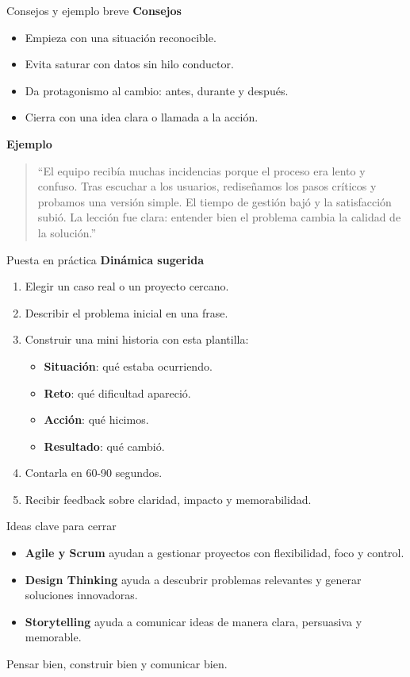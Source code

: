 \documentclass{beamer}
\begin{document}
\begin{frame}{Consejos y ejemplo breve}
\textbf{Consejos}
\begin{itemize}
    \item Empieza con una situación reconocible.
    \item Evita saturar con datos sin hilo conductor.
    \item Da protagonismo al cambio: antes, durante y después.
    \item Cierra con una idea clara o llamada a la acción.
\end{itemize}

\vspace{0.25cm}
\textbf{Ejemplo}
\begin{quote}
``El equipo recibía muchas incidencias porque el proceso era lento y confuso. Tras escuchar a los usuarios, rediseñamos los pasos críticos y probamos una versión simple. El tiempo de gestión bajó y la satisfacción subió. La lección fue clara: entender bien el problema cambia la calidad de la solución.''
\end{quote}
\end{frame}

\begin{frame}{Puesta en práctica}
\textbf{Dinámica sugerida}
\begin{enumerate}
    \item Elegir un caso real o un proyecto cercano.
    \item Describir el problema inicial en una frase.
    \item Construir una mini historia con esta plantilla:
    \begin{itemize}
        \item \textbf{Situación}: qué estaba ocurriendo.
        \item \textbf{Reto}: qué dificultad apareció.
        \item \textbf{Acción}: qué hicimos.
        \item \textbf{Resultado}: qué cambió.
    \end{itemize}
    \item Contarla en 60-90 segundos.
    \item Recibir feedback sobre claridad, impacto y memorabilidad.
\end{enumerate}
\end{frame}

\begin{frame}{Ideas clave para cerrar}
\begin{itemize}
    \item \textbf{Agile y Scrum} ayudan a gestionar proyectos con flexibilidad, foco y control.
    \item \textbf{Design Thinking} ayuda a descubrir problemas relevantes y generar soluciones innovadoras.
    \item \textbf{Storytelling} ayuda a comunicar ideas de manera clara, persuasiva y memorable.
\end{itemize}

\vspace{0.35cm}
\centering
\Large
Pensar bien, construir bien y comunicar bien.
\end{frame}
\end{document}
